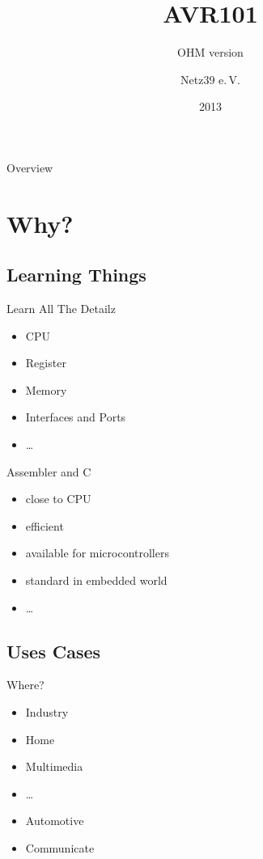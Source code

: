 \documentclass{beamer}
\title{AVR101}
\subtitle{OHM version}
\author{Netz39 e.\,V.}
\institute{\url{http://www.netz39.de/}}
\date{2013}
\begin{document}
\begin{frame}
	\titlepage
\end{frame}

\begin{frame}{Overview}
    \tableofcontents
\end{frame}

\section{Why?}

\subsection{Learning Things}

\begin{frame}{Learn All The Detailz}
    \begin{itemize}
        \item CPU
        \item Register
        \item Memory
        \item Interfaces and Ports
        \item \dots
    \end{itemize}
\end{frame}

\begin{frame}{Assembler and C}
    \begin{itemize}
        \item close to CPU
        \item efficient
        \item available for microcontrollers
        \item standard in embedded world
        \item \dots
    \end{itemize}
\end{frame}

\subsection{Uses Cases}

\begin{frame}{Where?}
    \begin{itemize}
        \item Industry
        \item Home
        \item Multimedia
        \item \dots
        \pause
        \item Automotive
        \item Communicate
    \end{itemize}
\end{frame}
\end{document}
